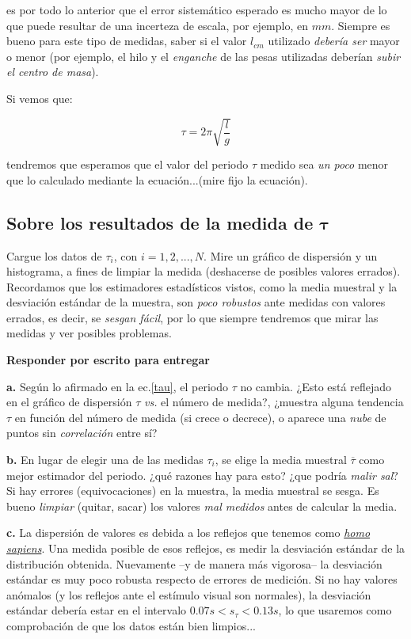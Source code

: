 \documentclass[10pt,a4paper]{article}
\numberwithin{equation}{section}%
\numberwithin{equation}{subsection}
\begin{document}
\noindent es por todo lo anterior que el error sistemático esperado es mucho mayor de lo que puede resultar de una incerteza de escala, por ejemplo, en $mm$. Siempre es bueno para este tipo de medidas, saber si el valor $l_{cm}$ utilizado \textit{debería ser} mayor o menor (por ejemplo, el hilo y el \textit{enganche} de las pesas utilizadas deberían \textit{subir el centro de masa}).

Si vemos que:

$$
\tau = 2\pi \sqrt{\frac{l}{g}}
$$

\noindent tendremos que esperamos que el valor del periodo $\tau$ medido sea \textit{un poco} menor que lo calculado mediante la ecuación...(mire fijo la ecuación).

\subsection{Sobre los resultados de la medida de $\mathbf{\tau}$}

Cargue los datos de $\tau_i$, con $i = 1,2,...,N$. Mire un gráfico de dispersión y un histograma, a fines de limpiar la medida (deshacerse de posibles valores errados). Recordamos que los estimadores estadísticos vistos, como la media muestral y la desviación estándar de la muestra, son \textit{poco robustos} ante medidas con valores errados, es decir, se \textit{sesgan fácil}, por lo que siempre tendremos que mirar las medidas y ver posibles problemas.

\noindent \textbf{Responder por escrito para entregar}

\noindent\textbf{a.} Según lo afirmado en la ec.\eqref{tau}, el periodo $\tau$ no cambia. ¿Esto está reflejado en el gráfico de dispersión $\tau$ \textit{vs.} el número de medida?, ¿muestra alguna tendencia $\tau$ en función del número de medida (si crece o decrece), o aparece una \textit{nube} de puntos sin \textit{correlación} entre sí? 

\noindent\textbf{b.} En lugar de elegir una de las medidas $\tau_i$, se elige la media muestral $\overline{\tau}$ como mejor estimador del periodo. ¿qué razones hay para esto? ¿que podría \textit{malir sal}? Si hay errores (equivocaciones) en la muestra, la media muestral se sesga. Es bueno \textit{limpiar} (quitar, sacar) los valores \textit{mal medidos} antes de calcular la media.

\noindent \textbf{c.} La dispersión de valores es debida a los reflejos que tenemos como  \href{https://es.wikipedia.org/wiki/Homo_sapiens_sapiens}\textit{\textit{homo sapiens}}. Una medida posible de esos reflejos, es medir la desviación estándar de la distribución obtenida. Nuevamente --y de manera más vigorosa-- la desviación estándar es muy poco robusta respecto de errores de medición. Si no hay valores anómalos (y los reflejos ante el estímulo visual son normales), la desviación estándar debería estar en el intervalo $0.07 s < s_{\tau} < 0.13s$, lo que usaremos como comprobación de que los datos están bien limpios...
\end{document}

